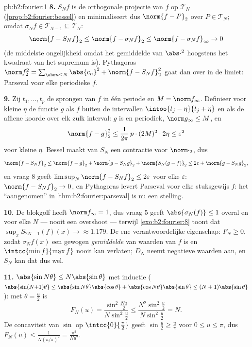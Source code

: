 \begin{solution}{pb:b2:fourier:1}
\textbf{8.} $S_Nf$ is de orthogonale projectie van $f$ op
$\mathcal T_N$ (\cref{prop:b2:fourier:bessel}) en minimaliseert
dus $\norm{f - P}_2$ over $P \in \mathcal T_N$; omdat $\sigma_Nf
\in \mathcal T_{N-1} \subseteq \mathcal T_N$:
\[
\norm{f - S_Nf}_2 \leq \norm{f - \sigma_Nf}_2
\leq \norm{f - \sigma_Nf}_\infty \to 0
\]
(de middelste ongelijkheid omdat het gemiddelde van
$\abs\cdot^2$ hoogstens het kwadraat van het supremum is).
Pythagoras $\norm f_2^2 = \sum_{\abs n\leq N}\abs{c_n}^2 + \norm{f
- S_Nf}_2^2$ gaat dan over in de limiet: Parseval voor elke
 periodieke $f$.

\textbf{9.} Zij $t_1, \dots, t_p$ de sprongen van $f$ in één
periode en $M = \norm f_\infty$. Definieer voor kleine $\eta$ de
functie $g$ als $f$ buiten de intervallen $\intoo{t_j - \eta}{t_j
+ \eta}$ en als de affiene koorde over elk zulk interval: $g$ is
 en periodiek, $\norm g_\infty \leq M$, en
\[
\norm{f - g}_2^2 \leq \frac{1}{2\pi}\,p\cdot(2M)^2\cdot2\eta
\leq \varepsilon^2
\]
voor kleine $\eta$. Bessel maakt van $S_N$ een contractie voor
$\norm\cdot_2$, dus
\[
\norm{f - S_Nf}_2
\leq \norm{f - g}_2 + \norm{g - S_Ng}_2 + \norm{S_N(g -
f)}_2
\leq 2\varepsilon + \norm{g - S_Ng}_2 ,
\]
en vraag 8 geeft $\limsup_N\norm{f - S_Nf}_2 \leq 2\varepsilon$
voor elke $\varepsilon$: $\norm{f - S_Nf}_2 \to 0$, en Pythagoras
levert Parseval voor elke stuksgewijs  $f$: het
``aangenomen'' in \cref{thm:b2:fourier:parseval} is nu een
stelling.

\textbf{10.} De blokgolf heeft $\norm f_\infty = 1$, dus vraag 5
geeft $\abs{\sigma_N(f)} \leq 1$ overal en voor elke $N$ --- nooit
een overshoot --- terwijl \cref{exo:b2:fourier:8} toont dat
$\sup_xS_{2N-1}(f)(x) \to \approx 1.179$. De ene verantwoordelijke
eigenschap: $F_N \geq 0$, zodat $\sigma_Nf(x)$ een gewogen
\emph{gemiddelde} van waarden van $f$ is en $\intcc{\min f}{\max
f}$ nooit kan verlaten; $D_N$ neemt negatieve waarden aan, en $S_N$
kan dat dus wel.

\textbf{11.} $\abs{\sin N\theta} \leq N\abs{\sin\theta}$ met
inductie ($\abs{\sin(N{+}1)\theta} \leq \abs{\sin
N\theta}\abs{\cos\theta} + \abs{\cos N\theta}\abs{\sin\theta} \leq
(N+1)\abs{\sin\theta}$): met $\theta = \frac u2$ is
\[
F_N(u) = \frac{\sin^2\frac{Nu}2}{N\sin^2\frac u2}
\leq \frac{N^2\sin^2\frac u2}{N\sin^2\frac u2} = N .
\]
De concaviteit van $\sin$ op $\intcc{0}{\frac\pi2}$ geeft
$\sin\frac u2 \geq \frac{u}{\pi}$ voor $0 \leq u \leq \pi$, dus
$F_N(u) \leq \frac{1}{N(u/\pi)^2} = \frac{\pi^2}{Nu^2}$.


\end{solution}
